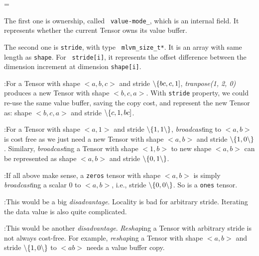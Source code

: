 {\leftskip=\parskip

  \quad The first one is ownership, called {\tt
  value-mode\_}, which is an internal field. It represents whether the current
  Tensor owns its value buffer.

  \quad The second one is {\tt stride}, with type {\tt
  mlvm\_size\_t*}.  It is an array with same length as {\tt shape}. For {\tt
  stride[i]}, it represents the offset difference between the dimension
  increment at dimension {\tt shape[i]}.

  {\leftskip

    :\quad For a Tensor with shape $<a,b, c>$ and stride
    $\backslash\{ bc, c, 1]$, {\it tranpose(1, 2, 0)} produces a new Tensor with
    shape $<b, c, a>$. With {\tt stride} property, we could re-use the same
    value buffer, saving the copy cost, and represent the new Tensor as: shape
    $<b, c, a>$ and stride $\backslash\{ c, 1, bc]$.

    :\quad For a Tensor with shape $<a, 1>$ and stride
    $\backslash\{ 1, 1\backslash\}$, {\it broadcast\/}ing to $<a,b>$ is cost free
    as we just need a new Tensor with shape $<a,b>$ and stride $\backslash\{ 1,
    0\backslash\}$. Similary, {\it broadcast\/}ing a Tensor with shape $<1, b>$
    to new shape $<a,b>$ can be represented as shape $<a,b>$ and stride
    $\backslash\{ 0, 1\backslash\}$.

    :\quad If all above make sense, a {\tt zeros} tensor
    with shape $<a,b>$ is simply {\it broadcast\/}ing a scalar $0$ to $<a,b>$,
    i.e., stride $\backslash\{ 0, 0\backslash\}$. So is a {\tt ones} tensor.

    :\quad This would be a big {\it disadvantage}.
    Locality is bad for arbitrary stride. Iterating the data value is also quite
    complicated.

    :\quad This would be another {\it disadvantage}.
    {\it Reshap\/}ing a Tensor with arbitrary stride is not always cost-free.
    For example, {\it reshap\/}ing a Tensor with shape $<a,b>$ and stride
    $\backslash\{ 1, 0\backslash\}$ to $<ab>$ needs a value buffer copy.

  \par}
\par}

\bye
